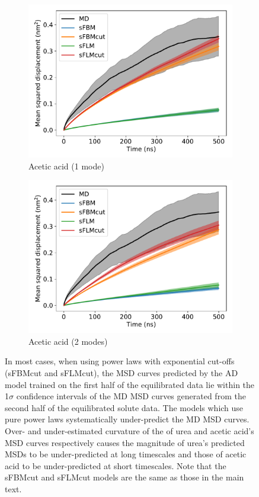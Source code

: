 \documentclass{article}
\begin{document}
\begin{figure}
\begin{subfigure}{0.45\textwidth}
  \includegraphics[width=\textwidth]{1mode_msd_comparison_ACH_train_front.pdf}
  \caption{Acetic acid (1 mode)}\label{fig:1mode_msd_comparison_ACH_train_front}
  \end{subfigure}
  \begin{subfigure}{0.45\textwidth}
  \includegraphics[width=\textwidth]{2mode_msd_comparison_ACH_train_front.pdf}
  \caption{Acetic acid (2 modes)}\label{fig:2mode_msd_comparison_ACH_train_front}
  \end{subfigure} 
  \caption{In most cases, when using power laws with exponential cut-offs 
  (sFBMcut and sFLMcut), the MSD curves predicted by the AD model trained on 
  the first half of the equilibrated data lie within the 1$\sigma$ confidence
  intervals of the MD MSD curves generated from the second half of the equilibrated
  solute data. The models which use pure power laws systematically under-predict
  the MD MSD curves. Over- and under-estimated curvature of the of urea and acetic acid's 
  MSD curves respectively causes the magnitude of urea's predicted MSDs to be 
  under-predicted at long timescales and those of acetic acid to be under-predicted
  at short timescales. Note that the sFBMcut and sFLMcut models are the same as 
  those in the main text.}\label{fig:train_test}
  \end{figure}
  
\end{document}

